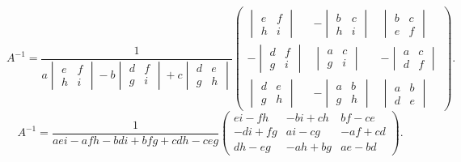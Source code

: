\[
A^{-1} = \frac{1}{
    a
    \begin{vmatrix}
        e & f\\
        h & i
    \end{vmatrix}
    - b
    \begin{vmatrix}
        d & f\\
        g & i
    \end{vmatrix}
    + c
    \begin{vmatrix}
        d & e\\
        g & h
    \end{vmatrix}
}
\begin{pmatrix}
    \begin{vmatrix}
        e & f\\
        h & i
    \end{vmatrix}
    & -
    \begin{vmatrix}
        b & c\\
        h & i
    \end{vmatrix}
    &
    \begin{vmatrix}
        b & c\\
        e & f
    \end{vmatrix}
    \\
    -
    \begin{vmatrix}
        d & f\\
        g & i
    \end{vmatrix}
    &
    \begin{vmatrix}
        a & c\\
        g & i
    \end{vmatrix}
    &
    -
    \begin{vmatrix}
        a & c\\
        d & f
    \end{vmatrix}
    \\
    \begin{vmatrix}
        d & e\\
        g & h
    \end{vmatrix}
    &
    -
    \begin{vmatrix}
        a & b\\
        g & h
    \end{vmatrix}
    &
    \begin{vmatrix}
        a & b\\
        d & e
    \end{vmatrix}
\end{pmatrix}
.
\]
\[
A^{-1} =
\frac{1}{a e i - a f h - b d i + b f g + c d h - c e g}
\begin{pmatrix}
    e i - f h & - b i + c h & b f - c e\\
    - d i + f g & a i - c g & - a f + c d\\
    d h - e g & - a h + b g & a e - b d
\end{pmatrix}
.
\]
